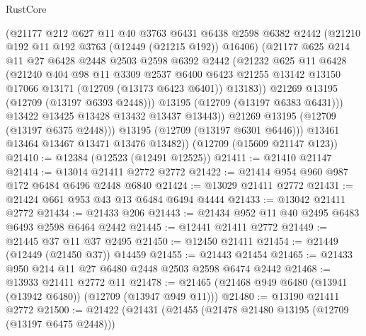 \begin{lexlean}{RustCore}
\begin{coremodule}
                (@21177
                  @212
                  @627
                  @11
                  @40
                  @3763
                  @6431
                  @6438
                  @2598
                  @6382
                  @2442
                  (@21210 @192 @11 @192 @3763 (@12449 (@21215 @192)) @16406)
                  (@21177
                    @625
                    @214
                    @11
                    @27
                    @6428
                    @2448
                    @2503
                    @2598
                    @6392
                    @2442
                    (@21232
                      @625
                      @11
                      @6428
                      (@21240
                        @404
                        @98
                        @11
                        @3309
                        @2537
                        @6400
                        @6423
                        @21255
                        @13142
                        @13150
                        @17066
                        @13171
                        (@12709 (@13173 @6423 @6401))
                        @13183))
                    @21269
                    @13195
                    (@12709 (@13197 @6393 @2448)))
                  @13195
                  (@12709 (@13197 @6383 @6431)))
                @13422
                @13425
                @13428
                @13432
                @13437
                @13443))
            @21269
            @13195
            (@12709 (@13197 @6375 @2448)))
          @13195
          (@12709 (@13197 @6301 @6446)))
        @13461
        @13464
        @13467
        @13471
        @13476
        @13482))
    (@12709 (@15609 @21147 @123))
@21410 := @12384 (@12523 (@12491 @12525))
@21411 := @21410 @21147
@21414 := @13014 @21411 @2772 @2772
@21422 := @21414 @954 @960 @987 @172 @6484 @6496 @2448 @6840
@21424 := @13029 @21411 @2772
@21431 := @21424 @661 @953 @43 @13 @6484 @6494 @4444
@21433 := @13042 @21411 @2772
@21434 := @21433 @206
@21443 := @21434 @952 @11 @40 @2495 @6483 @6493 @2598 @6464 @2442
@21445 := @12441 @21411 @2772
@21449 := @21445 @37 @11 @37 @2495
@21450 := @12450 @21411
@21454 := @21449 (@12449 (@21450 @37)) @14459
@21455 := @21443 @21454
@21465 := @21433 @950 @214 @11 @27 @6480 @2448 @2503 @2598 @6474 @2442
@21468 := @13933 @21411 @2772 @11
@21478 := @21465 (@21468 @949 @6480 (@13941 (@13942 @6480)) (@12709 (@13947 @949 @11)))
@21480 := @13190 @21411 @2772
@21500 := @21422
    (@21431
      (@21455
        (@21478 @21480 @13195 (@12709 (@13197 @6475 @2448)))

\end{coremodule}
\end{lexlean}
